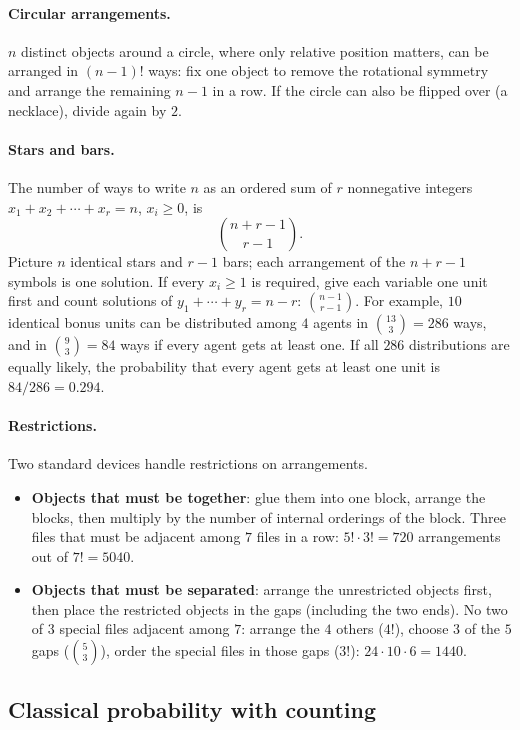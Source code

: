 \paragraph{Circular arrangements.}
$n$ distinct objects around a circle, where only relative position matters, can be arranged in
$(n-1)!$ ways: fix one object to remove the rotational symmetry and arrange the remaining $n-1$
in a row. If the circle can also be flipped over (a necklace), divide again by $2$.

\paragraph{Stars and bars.}
The number of ways to write $n$ as an ordered sum of $r$ nonnegative integers
$x_1 + x_2 + \cdots + x_r = n$, $x_i \ge 0$, is
\[
\binom{n+r-1}{r-1} .
\]
Picture $n$ identical stars and $r-1$ bars; each arrangement of the $n+r-1$ symbols is one
solution. If every $x_i \ge 1$ is required, give each variable one unit first and count
solutions of $y_1+\cdots+y_r = n-r$: $\binom{n-1}{r-1}$. For example, $10$ identical bonus
units can be distributed among $4$ agents in $\binom{13}{3}=286$ ways, and in
$\binom{9}{3}=84$ ways if every agent gets at least one. If all $286$ distributions are
equally likely, the probability that every agent gets at least one unit is $84/286 = 0.294$.

\paragraph{Restrictions.}
Two standard devices handle restrictions on arrangements.
\begin{itemize}[nosep]
\item \textbf{Objects that must be together}: glue them into one block, arrange the blocks,
then multiply by the number of internal orderings of the block. Three files that must be
adjacent among $7$ files in a row: $5!\cdot 3! = 720$ arrangements out of $7! = 5040$.
\item \textbf{Objects that must be separated}: arrange the unrestricted objects first, then
place the restricted objects in the gaps (including the two ends). No two of $3$ special
files adjacent among $7$: arrange the $4$ others ($4!$), choose $3$ of the $5$ gaps
($\binom{5}{3}$), order the special files in those gaps ($3!$): $24\cdot 10\cdot 6 = 1440$.
\end{itemize}

\subsection{Classical probability with counting}

